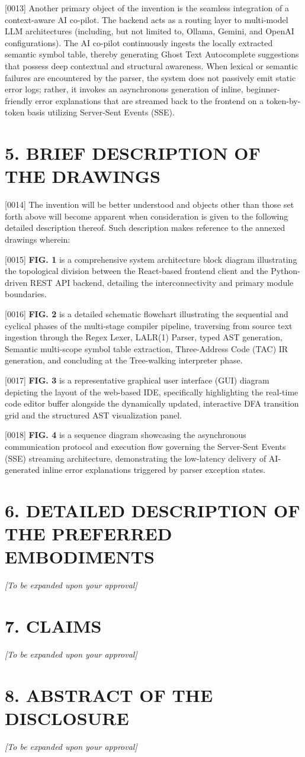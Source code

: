 \documentclass[12pt, a4paper]{article}
\begin{document}
[0013] Another primary object of the invention is the seamless integration of a context-aware AI co-pilot. The backend acts as a routing layer to multi-model LLM architectures (including, but not limited to, Ollama, Gemini, and OpenAI configurations). The AI co-pilot continuously ingests the locally extracted semantic symbol table, thereby generating Ghost Text Autocomplete suggestions that possess deep contextual and structural awareness. When lexical or semantic failures are encountered by the parser, the system does not passively emit static error logs; rather, it invokes an asynchronous generation of inline, beginner-friendly error explanations that are streamed back to the frontend on a token-by-token basis utilizing Server-Sent Events (SSE).

\section*{5. BRIEF DESCRIPTION OF THE DRAWINGS}
[0014] The invention will be better understood and objects other than those set forth above will become apparent when consideration is given to the following detailed description thereof. Such description makes reference to the annexed drawings wherein:

[0015] \textbf{FIG. 1} is a comprehensive system architecture block diagram illustrating the topological division between the React-based frontend client and the Python-driven REST API backend, detailing the interconnectivity and primary module boundaries.

[0016] \textbf{FIG. 2} is a detailed schematic flowchart illustrating the sequential and cyclical phases of the multi-stage compiler pipeline, traversing from source text ingestion through the Regex Lexer, LALR(1) Parser, typed AST generation, Semantic multi-scope symbol table extraction, Three-Address Code (TAC) IR generation, and concluding at the Tree-walking interpreter phase.

[0017] \textbf{FIG. 3} is a representative graphical user interface (GUI) diagram depicting the layout of the web-based IDE, specifically highlighting the real-time code editor buffer alongside the dynamically updated, interactive DFA transition grid and the structured AST visualization panel.

[0018] \textbf{FIG. 4} is a sequence diagram showcasing the asynchronous communication protocol and execution flow governing the Server-Sent Events (SSE) streaming architecture, demonstrating the low-latency delivery of AI-generated inline error explanations triggered by parser exception states.

\section*{6. DETAILED DESCRIPTION OF THE PREFERRED EMBODIMENTS}
\textit{[To be expanded upon your approval]}

\section*{7. CLAIMS}
\textit{[To be expanded upon your approval]}

\section*{8. ABSTRACT OF THE DISCLOSURE}
\textit{[To be expanded upon your approval]}
\end{document}
